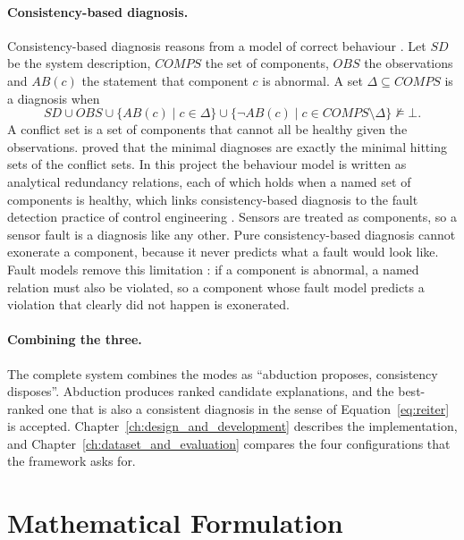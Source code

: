 \paragraph{Consistency-based diagnosis.} Consistency-based diagnosis reasons from a model of correct behaviour \parencite{reiter1987,dekleer1987}. Let $\mathit{SD}$ be the system description, $\mathit{COMPS}$ the set of components, $\mathit{OBS}$ the observations and $\mathit{AB}(c)$ the statement that component $c$ is abnormal. A set $\Delta \subseteq \mathit{COMPS}$ is a diagnosis when
\begin{equation}
  \mathit{SD} \cup \mathit{OBS} \cup \{\mathit{AB}(c) \mid c \in \Delta\} \cup \{\neg\mathit{AB}(c) \mid c \in \mathit{COMPS} \setminus \Delta\} \not\models \bot .
  \label{eq:reiter}
\end{equation}
A conflict set is a set of components that cannot all be healthy given the observations. \textcite{reiter1987} proved that the minimal diagnoses are exactly the minimal hitting sets of the conflict sets. In this project the behaviour model is written as analytical redundancy relations, each of which holds when a named set of components is healthy, which links consistency-based diagnosis to the fault detection practice of control engineering \parencite{cordier2004}. Sensors are treated as components, so a sensor fault is a diagnosis like any other. Pure consistency-based diagnosis cannot exonerate a component, because it never predicts what a fault would look like. Fault models remove this limitation \parencite{struss1989}: if a component is abnormal, a named relation must also be violated, so a component whose fault model predicts a violation that clearly did not happen is exonerated.

\paragraph{Combining the three.} The complete system combines the modes as ``abduction proposes, consistency disposes''. Abduction produces ranked candidate explanations, and the best-ranked one that is also a consistent diagnosis in the sense of Equation~\eqref{eq:reiter} is accepted. Chapter~\ref{ch:design_and_development} describes the implementation, and Chapter~\ref{ch:dataset_and_evaluation} compares the four configurations that the framework asks for.

\section{Mathematical Formulation}
\label{sec:maths}

